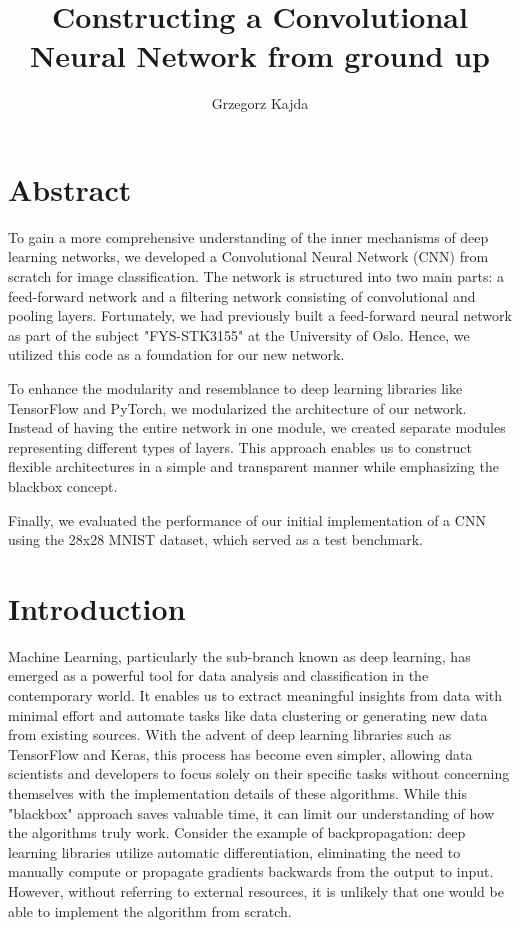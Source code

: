 \documentclass[onecolumn,10pt,cleanfoot]{asme2ej}
\author{Grzegorz Kajda
    \affiliation{
	Bachelor Student, Robotics and Intelligent Systems\\ \\[-10pt]
	Department of Informatics The faculty of Mathematics and Natural Sciences\\ \\[-10pt]
    Email: grzegork@ifi.uio.no
    }
}
\begin{document}
\title{Constructing a Convolutional Neural Network from ground up}
\maketitle

\section{Abstract}

To gain a more comprehensive understanding of the inner mechanisms of deep learning networks, we developed a Convolutional Neural Network (CNN) from scratch for image classification. The network is structured into two main parts: a feed-forward network and a filtering network consisting of convolutional and pooling layers. Fortunately, we had previously built a feed-forward neural network as part of the subject "FYS-STK3155" at the University of Oslo. Hence, we utilized this code as a foundation for our new network.

To enhance the modularity and resemblance to deep learning libraries like TensorFlow and PyTorch, we modularized the architecture of our network. Instead of having the entire network in one module, we created separate modules representing different types of layers. This approach enables us to construct flexible architectures in a simple and transparent manner while emphasizing the blackbox concept.

Finally, we evaluated the performance of our initial implementation of a CNN using the 28x28 MNIST dataset, which served as a test benchmark.

\section{Introduction}
Machine Learning, particularly the sub-branch known as deep learning, has emerged as a powerful tool for data analysis and classification in the contemporary world. It enables us to extract meaningful insights from data with minimal effort and automate tasks like data clustering or generating new data from existing sources. With the advent of deep learning libraries such as TensorFlow and Keras, this process has become even simpler, allowing data scientists and developers to focus solely on their specific tasks without concerning themselves with the implementation details of these algorithms. While this "blackbox" approach saves valuable time, it can limit our understanding of how the algorithms truly work. Consider the example of backpropagation: deep learning libraries utilize automatic differentiation, eliminating the need to manually compute or propagate gradients backwards from the output to input. However, without referring to external resources, it is unlikely that one would be able to implement the algorithm from scratch.
\end{document}
